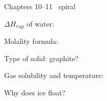 \documentclass{apchem-worksheet}
\begin{document}
\begin{spiralstrip}{Chapters 10--11 \textbullet\ spiral}
  \item $\Delta H_{\text{vap}}$ of water:
  \item Molality formula: 
  \item Type of solid: graphite? 
  \item Gas solubility and temperature:
  \item Why does ice float? 
\end{spiralstrip}
\end{document}
